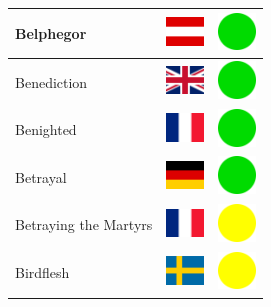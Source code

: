 \documentclass[12pt, a4paper, twoside]{report}
\begin{document}
\begin{center}
\begin{longtable}{|p{5cm}|p{2cm}|p{2cm}|}
			Belphegor & \includegraphics[width=1cm]{4x3/at} & \includegraphics[width=1cm]{likes/y} \\ \hline
			Benediction & \includegraphics[width=1cm]{4x3/gb} & \includegraphics[width=1cm]{likes/y} \\ \hline
			Benighted & \includegraphics[width=1cm]{4x3/fr} & \includegraphics[width=1cm]{likes/y} \\ \hline
			Betrayal & \includegraphics[width=1cm]{4x3/de} & \includegraphics[width=1cm]{likes/y} \\ \hline
			Betraying the Martyrs & \includegraphics[width=1cm]{4x3/fr} & \includegraphics[width=1cm]{likes/m} \\ \hline
			Birdflesh & \includegraphics[width=1cm]{4x3/se} & \includegraphics[width=1cm]{likes/m} \\ \hline

\end{longtable}
\end{center}
\end{document}
